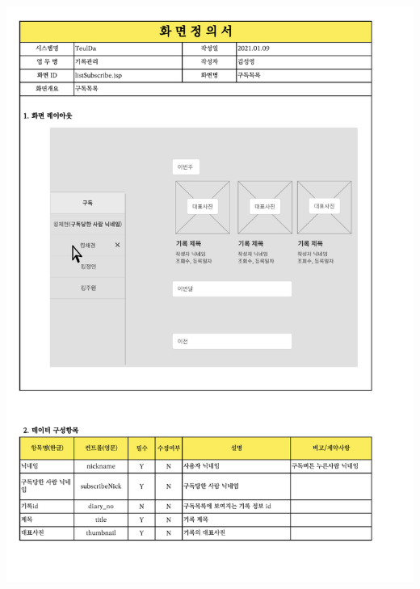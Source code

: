 {{{{{{{{{{{{{{{{{{{{{{\includegraphics[width=20cm]{./Figure/Analysis/Display/diary/diary_21.pdf} \\
}}}}}}}}}}}}}}}}}}}}}}
